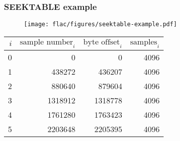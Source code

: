 \subsubsection{SEEKTABLE example}
\begin{figure}[h]
  \texttt{[image: flac/figures/seektable-example.pdf]}
\end{figure}
\begin{table}[h]
{
\begin{tabular}{r|rrr}
$i$ & $\text{sample number}_i$ & $\text{byte offset}_i$ & $\text{samples}_i$ \\
\hline
0 & 0 & 0 & 4096 \\
1 & 438272 & 436207 & 4096 \\
2 & 880640 & 879604 & 4096 \\
3 & 1318912 & 1318778 & 4096 \\
4 & 1761280 & 1763423 & 4096 \\
5 & 2203648 & 2205395 & 4096 \\
\end{tabular}
}
\end{table}

\clearpage

